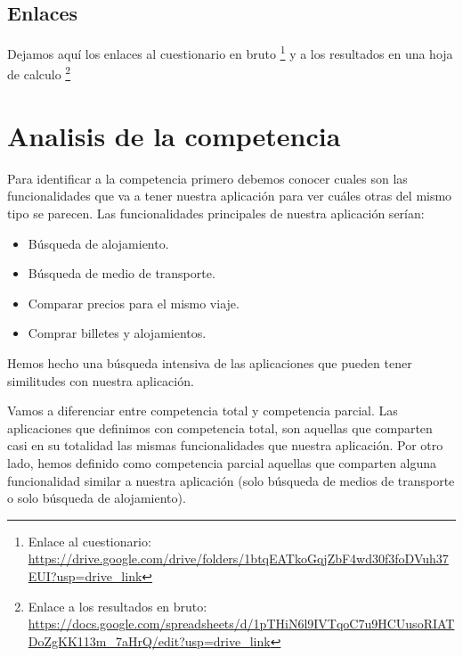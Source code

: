 \subsection{Enlaces}

Dejamos aquí los enlaces al cuestionario en bruto \footnote{Enlace al cuestionario: \url{https://drive.google.com/drive/folders/1btqEATkoGqjZbF4wd30f3foDVuh37EUI?usp=drive_link}} y a los resultados en una hoja de calculo \footnote{ Enlace a los resultados en bruto: \url{https://docs.google.com/spreadsheets/d/1pTHiN6l9IVTqoC7u9HCUusoRIATDoZgKK113m_7aHrQ/edit?usp=drive_link}}

\section{Analisis de la competencia}

Para identificar a la competencia primero debemos conocer cuales son las funcionalidades que va a tener nuestra aplicación para ver cuáles otras del mismo tipo se parecen. Las funcionalidades principales de nuestra aplicación serían:
\begin{itemize}
    \item Búsqueda de alojamiento.
    \item Búsqueda de medio de transporte.
    \item Comparar precios para el mismo viaje.
    \item Comprar billetes y alojamientos.
\end{itemize}

Hemos hecho una búsqueda intensiva de las aplicaciones que pueden tener similitudes con nuestra aplicación.

Vamos a diferenciar entre competencia total y competencia parcial. Las aplicaciones que definimos con competencia total, son aquellas que comparten casi en su totalidad las mismas funcionalidades que nuestra aplicación. Por otro lado, hemos definido como competencia parcial aquellas que comparten alguna funcionalidad similar a nuestra aplicación (solo búsqueda de medios de transporte o solo búsqueda de alojamiento).

